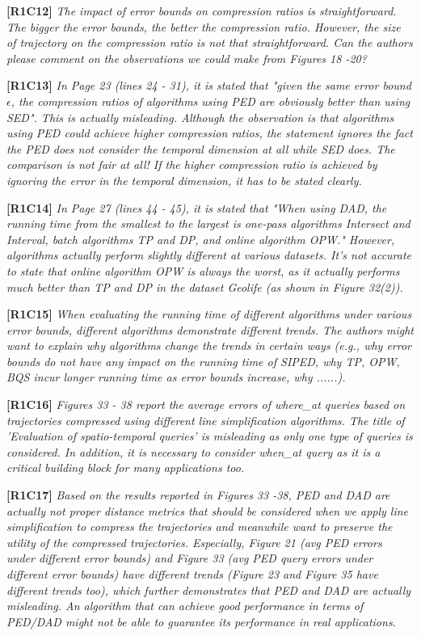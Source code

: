\documentclass{letter}
\begin{document}
\textbf{[R1C12]} \emph{ The impact of error bounds on compression ratios is straightforward. The bigger the error bounds, the better the compression ratio. However, the size of trajectory on the compression ratio is not that straightforward. Can the authors please comment on the observations we could make from Figures 18 -20? }

\textbf{[R1C13]} \emph{ In Page 23 (lines 24 - 31), it is stated that "given the same error bound $\epsilon$, the compression ratios of algorithms using PED are obviously better than using SED". This is actually misleading. Although the observation is that algorithms using PED could achieve higher compression ratios, the statement ignores the fact the PED does not consider the temporal dimension at all while SED does. The comparison is not fair at all! If the higher compression ratio is achieved by ignoring the error in the temporal dimension, it has to be stated clearly.} 

\textbf{[R1C14]} \emph{ In Page 27 (lines 44 - 45), it is stated that "When using DAD, the running time from the smallest to the largest is one-pass algorithms Intersect and Interval, batch algorithms TP and DP, and online algorithm OPW." However, algorithms actually perform slightly different at various datasets. It's not accurate to state that online algorithm OPW is always the worst, as it actually performs much better than TP and DP in the dataset Geolife (as shown in Figure 32(2)).}

\textbf{[R1C15]} \emph{ When evaluating the running time of different algorithms under various error bounds, different algorithms demonstrate different trends. The authors might want to explain why algorithms change the trends in certain ways (e.g., why error bounds do not have any impact on the running time of SIPED, why TP, OPW, BQS incur longer running time as error bounds increase, why ......).}

\textbf{[R1C16]} \emph{ Figures 33 - 38 report the average errors of where\_at queries based on trajectories compressed using different line simplification algorithms. The title of 'Evaluation of spatio-temporal queries' is misleading as only one type of queries is considered. In addition, it is necessary to consider when\_at query as it is a critical building block for many applications too.} 

\textbf{[R1C17]} \emph{ Based on the results reported in Figures 33 -38, PED and DAD are actually not proper distance metrics that should be considered when we apply line simplification to compress the trajectories and meanwhile want to preserve the utility of the compressed trajectories. Especially, Figure 21 (avg PED errors under different error bounds) and Figure 33 (avg PED query errors under different error bounds) have different trends (Figure 23 and Figure 35 have different trends too), which further demonstrates that PED and DAD are actually misleading. An algorithm that can achieve good performance in terms of PED/DAD might not be able to guarantee its performance in real applications. }
\end{document}
